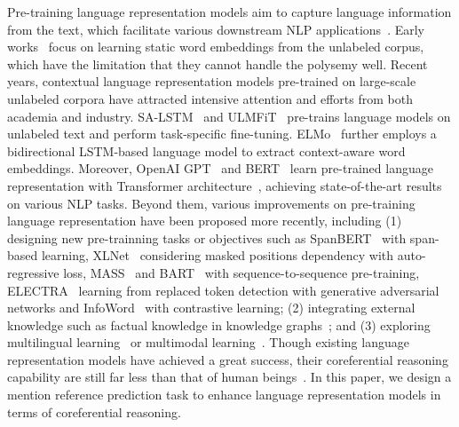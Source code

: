 \documentclass[11pt,a4paper]{article}
\begin{document}
Pre-training language representation models aim to capture language information from the text, which facilitate various downstream NLP applications~\citep{sentenceclassfication,relationextraction,BIDAF}. Early works~\citep{word2vec,glove} focus on learning static word embeddings from the unlabeled corpus, which have the limitation that they cannot handle the polysemy well. Recent years, contextual language representation models pre-trained on large-scale unlabeled corpora have attracted intensive attention and efforts from both academia and industry. SA-LSTM~\citep{Semisuperviedsequencelearning} and ULMFiT~\citep{ULMFiT} pre-trains language models on unlabeled text and perform task-specific fine-tuning. ELMo~\citep{elmo} further employs a bidirectional LSTM-based language model to extract context-aware word embeddings. Moreover, OpenAI GPT~\citep{GPT} and BERT~\citep{BERT} learn pre-trained language representation with Transformer architecture~\citep{Transformer}, achieving state-of-the-art results on various NLP tasks. Beyond them, various improvements on pre-training language representation have been proposed more recently, including (1) designing new pre-trainning tasks or objectives such as SpanBERT~\citep{Spanbert} with span-based learning, XLNet~\citep{XLNET} considering masked positions dependency with auto-regressive loss, MASS~\citep{MASS} and BART~\citep{wang-etal-2019-denoising} with sequence-to-sequence pre-training, ELECTRA~\citep{clark2019electra} learning from replaced token detection with generative adversarial networks and InfoWord~\citep{kong2019mutual} with contrastive learning; 
(2) integrating external knowledge such as factual knowledge in knowledge graphs~\citep{TsinghuaERNIE,peters-etal-2019-knowledge,weijie2019kbert}; and (3) exploring multilingual learning~\citep{conneau2019cross,tan-bansal-2019-lxmert,kondratyuk-straka-2019-75} or multimodal learning~\citep{lu2019vilbert,Sun_2019_ICCV,su2019vl}.  Though existing language representation models have achieved a great success, their coreferential reasoning capability are still far less than that of human beings~\citep{Lambada,QUOREF}. In this paper, we design a mention reference prediction task to enhance language representation models in terms of coreferential reasoning.
\end{document}
